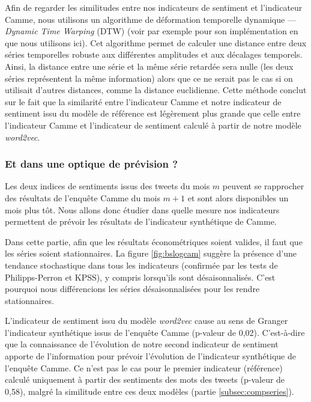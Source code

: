 \documentclass[11pt,french,french]{article}
\begin{document}
Afin de regarder les similitudes entre nos indicateurs de sentiment et l'indicateur Camme, nous utilisons un algorithme de déformation temporelle dynamique --- \emph{Dynamic Time Warping} (DTW) (voir par exemple \cite{dtw} pour son implémentation en \faRProject{} que nous utilisons ici).
Cet algorithme permet de calculer une distance entre deux séries temporelles robuste aux différentes amplitudes et aux décalages temporels.
Ainsi, la distance entre une série et la même série retardée sera nulle (les deux séries représentent la même information) alors que ce ne serait pas le cas si on utilisait d'autres distances, comme la distance euclidienne.
Cette méthode conclut sur le fait que la similarité entre l'indicateur Camme et notre indicateur de sentiment issu du modèle de référence est légèrement plus grande que celle entre l'indicateur Camme et l'indicateur de sentiment calculé à partir de notre modèle \emph{word2vec}.

\hypertarget{et-dans-une-optique-de-pruxe9vision}{%
\subsubsection{Et dans une optique de prévision ?}\label{et-dans-une-optique-de-pruxe9vision}}

Les deux indices de sentiments issus des tweets du mois \(m\) peuvent se rapprocher des résultats de l'enquête Camme du mois \(m+1\) et sont alors disponibles un mois plus tôt.
Nous allons donc étudier dans quelle mesure nos indicateurs permettent de prévoir les résultats de l'indicateur synthétique de Camme.

Dans cette partie, afin que les résultats économétriques soient valides, il faut que les séries soient stationnaires.
La figure \ref{fig:bslogcam} suggère la présence d'une tendance stochastique dans tous les indicateurs (confirmée par les tests de Philipps-Perron et KPSS), y compris lorsqu'ils sont désaisonnalisés.
C'est pourquoi nous différencions les séries désaisonnalisées pour les rendre stationnaires.

L'indicateur de sentiment issu du modèle \emph{word2vec} cause au sens de Granger l'indicateur synthétique issus de l'enquête Camme (p-valeur de 0,02).
C'est-à-dire que la connaissance de l'évolution de notre second indicateur de sentiment apporte de l'information pour prévoir l'évolution de l'indicateur synthétique de l'enquête Camme.
Ce n'est pas le cas pour le premier indicateur (référence) calculé uniquement à partir des sentiments des mots des tweets (p-valeur de 0,58), malgré la similitude entre ces deux modèles (partie \ref{subsec:compseries}).
\end{document}
